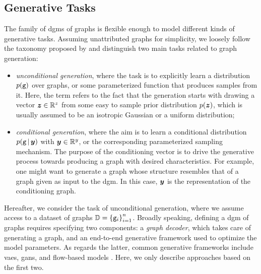 \subsection{Generative Tasks}
The family of \glspl{dgm} of graphs is flexible enough to model different kinds of generative tasks. Assuming unattributed graphs for simplicity, we loosely follow the taxonomy proposed by \citet{guo2020systematicreviewgenerativegraphs} and distinguish two main tasks related to graph generation:
\begin{itemize}
    \item \emph{unconditional generation}, where the task is to explicitly learn a distribution $p(\mathtt{g})$ over graphs, or some parameterized function that produces samples from it. Here, the term  refers to the fact that the generation starts with drawing a vector $\Vector{z} \in \Real^z$ from some easy to sample prior distribution $p(\Vector{z})$, which is usually assumed to be an isotropic Gaussian or a uniform distribution;
    \item \emph{conditional generation}, where the aim is to learn a conditional distribution $p(\Graph{g} \given \Vector{y})$ with $\Vector{y} \in \Real^y$, or the corresponding parameterized sampling mechanism. The purpose of the conditioning vector is to drive the generative process towards producing a graph with desired characteristics. For example, one might want to generate a graph whose structure resembles that of a graph given as input to the \gls{dgm}. In this case, $\Vector{y}$ is the representation of the conditioning graph.
\end{itemize}
Hereafter, we consider the task of unconditional generation, where we assume access to a dataset of graphs $\mathbb{D} = \left\{ \mathtt{g}_i \right\}_{i=1}^n$. Broadly speaking, defining a \gls{dgm} of graphs requires specifying two components: a \emph{graph decoder}, which takes care of generating a graph, and an end-to-end generative framework used to optimize the model parameters. As regards the latter, common generative frameworks include \glspl{vae}, \glspl{gan}, and flow-based models \citep{rezende2015normalizingflows}. Here, we only describe approaches based on the first two.

